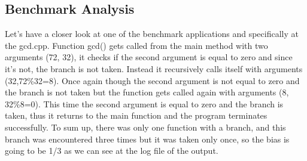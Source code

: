 \subsection{Benchmark Analysis}
Let's have a closer look at one of the benchmark applications and specifically at the gcd.cpp. Function gcd() gets called from the main method with two arguments (72, 32), it checks if the second argument is equal to zero and since it's not, the branch is not taken. Instead it recursively calls itself with arguments (32,72\%32=8). Once again though the second argument is not equal to zero and the branch is not taken but the function gets called again with arguments (8, 32\%8=0). This time the second argument is equal to zero and the branch is taken, thus it returns to the main function and the program terminates successfully. To sum up, there was only one function with a branch, and this branch was encountered three times but it was taken only once, so the bias is going to be 1/3 as we can see at the log file of the output.	
